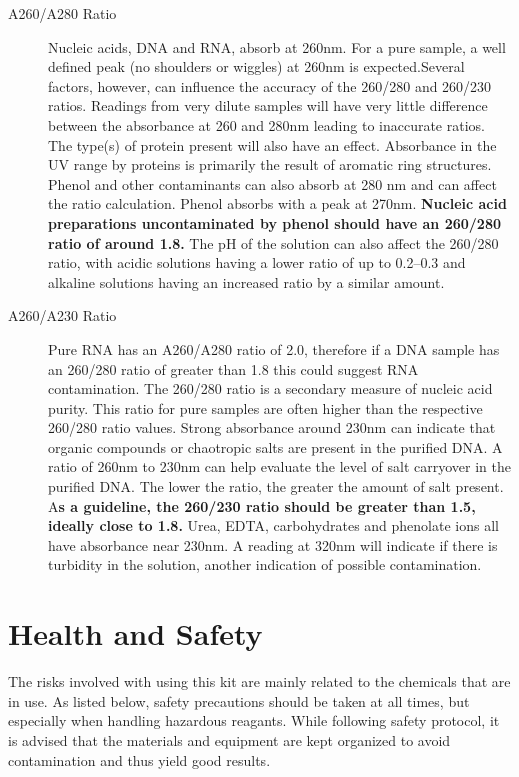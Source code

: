 \documentclass[12pt]{../SOP3_alpha}
\begin{document}
\begin{description}
  \item[A260/A280 Ratio] Nucleic acids, DNA and RNA, absorb at 260nm. For a pure sample, a well defined peak (no shoulders or wiggles) at 260nm is expected.Several factors, however, can influence the accuracy of the 260/280 and 260/230 ratios. Readings from very dilute samples will have very little difference between the absorbance at 260 and 280nm leading to inaccurate ratios.  The type(s) of protein present will also have an effect.  Absorbance in the UV range by proteins is primarily the result of aromatic ring structures. Phenol and other contaminants can also absorb at 280 nm and can affect the ratio calculation. Phenol absorbs with a peak at 270nm. \textbf{Nucleic acid preparations uncontaminated by phenol should have an 260/280 ratio of around 1.8. } The pH of the solution can also affect the 260/280 ratio, with acidic solutions having a lower ratio of up to 0.2–0.3 and alkaline solutions having an increased ratio by a similar amount.
  \item[A260/A230 Ratio] Pure RNA has an A260/A280 ratio of 2.0, therefore if a DNA sample has an 260/280 ratio of greater than 1.8 this could suggest RNA contamination. The 260/280 ratio is a secondary measure of nucleic acid purity. This ratio for pure samples are often higher than the respective 260/280 ratio values. Strong absorbance around 230nm can indicate that organic compounds or chaotropic salts are present in the purified DNA.  A ratio of 260nm to 230nm can help evaluate the level of salt carryover in the purified DNA. The lower the ratio, the greater the amount of salt present. A\textbf{s a guideline, the 260/230 ratio should be greater than 1.5, ideally close to 1.8. } Urea, EDTA, carbohydrates and phenolate ions all have absorbance near 230nm. A reading at 320nm will indicate if there is turbidity in the solution, another indication of possible contamination.  

\end{description}



\section{Health and Safety}

\NP The risks involved with using this kit are mainly related to the chemicals that are in use. As listed below, safety precautions should be taken at all times, but especially when handling hazardous reagants. While following safety protocol, it is advised that the materials and equipment are kept organized to avoid contamination and thus yield good results. 
\end{document}
